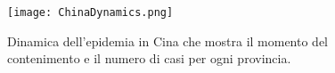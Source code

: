 \documentclass[onecolumn,journal]{IEEEtran}
\begin{document}
\begin{figure}[H]
\begin{centering}
\captionsetup{justification=centering}
\texttt{[image: ChinaDynamics.png]}
\caption{Dinamica dell'epidemia in Cina che mostra il momento del contenimento e il numero di casi per ogni provincia.}
\end{centering}
\end{figure}




% 
\end{document}
